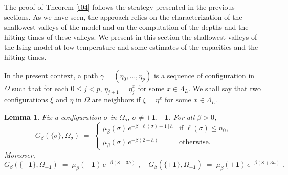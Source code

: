 \documentclass[reqno]{amsart}
\newtheorem{lemma}[theorem]{Lemma}
\begin{document}
The proof of Theorem \ref{t04} follows the strategy presented in the
previous sections. As we have seen, the approach relies on the
characterization of the shallowest valleys of the model and on the
computation of the depths and the hitting times of these valleys. We
present in this section the shallowest valleys of the Ising model at
low temperature and some estimates of the capacities and the hitting
times.

In the present context, a path $\gamma = (\eta_0, \dots, \eta_p)$ is a
sequence of configuration in $\Omega$ such that for each $0\le j<p$,
$\eta_{j+1} = \eta^{x}_j$ for some $x\in\Lambda_L$.  We shall say
that two configurations $\xi$ and $\eta$ in $\Omega$ are neighbors if
$\xi = \eta^x$ for some $x\in \Lambda_L$.

\begin{lemma}
\label{t01}
Fix a configuration $\sigma$ in $\Omega_o$, $\sigma \not = + {{\mathbf 1}}, -
{{\mathbf 1}}$. For all $\beta>0$,
\begin{equation}
\label{e01}
G_\beta(\{\sigma\} , \Omega_\sigma) \;=\; 
\begin{cases}
\mu_\beta (\sigma) \, e^{- \beta [\ell(\sigma) -1] h} 
& \text{if $\ell(\sigma) \le n_0$,} \\
\mu_\beta (\sigma) \, e^{-\beta (2-h)} & \text{otherwise.}
\end{cases}
\end{equation}
Moreover,
\begin{equation*}
G_\beta(\{-{{\mathbf 1}}\} , \Omega_{-{{\mathbf 1}}}) \;=\; 
\mu_\beta (-{{\mathbf 1}}) \, e^{- \beta (8-3 h)} \;,\quad
G_\beta(\{+{{\mathbf 1}}\} , \Omega_{+{{\mathbf 1}}}) \;=\; 
\mu_\beta (+{{\mathbf 1}}) \, e^{- \beta (8+3 h)}\;.
\end{equation*}

\end{lemma}
\end{document}
